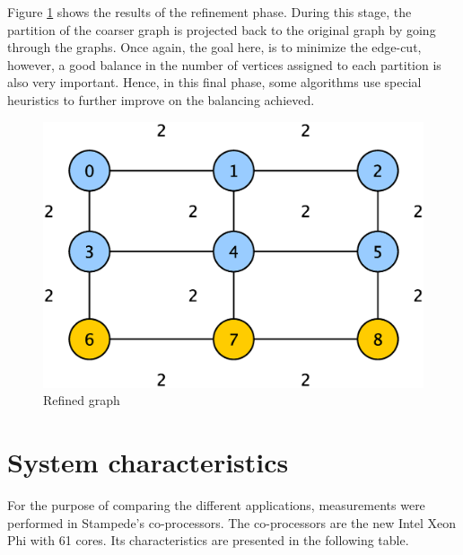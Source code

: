 \documentclass[abstract=on,9pt,twocolumn]{scrartcl}
\begin{document}
Figure \ref{img:refined_graph} shows the results of the refinement phase. During this stage, the partition of the coarser graph is projected back to the original graph by going through the graphs.\cite{Karypis:1998:FHQ:305219.305248}
Once again, the goal here, is to minimize the edge-cut, however, a good balance in the number of vertices assigned to each partition is also very important. Hence, in this final phase, some algorithms use special heuristics to further improve on the balancing achieved.
\begin{center}
  \begin{figure}[htb]
    \includegraphics[width=\columnwidth]{img/refinement.eps}
    \caption{Refined graph}
    \label{img:refined_graph} 
  \end{figure}
\end{center}



\section{System characteristics}
\label{sec:sys_char}
For the purpose of comparing the different applications, measurements
were performed in Stampede's co-processors. The co-processors are the
new Intel Xeon Phi with 61 cores. Its characteristics are presented in
the following table.
\end{document}

